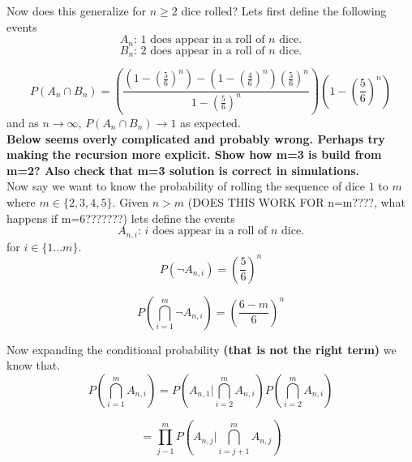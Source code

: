 \documentclass[12pt,a4paper]{article}
\begin{document}
Now does this generalize for $n\geq 2$ dice rolled? Lets first define the following events
\begin{equation}
A_n \text{: 1 does appear in a roll of $n$ dice.}
\end{equation}
\begin{equation}
B_n \text{: 2 does appear in a roll of $n$ dice.}
\end{equation}

\begin{equation}
P(A_n \cap B_n) = \left(\frac{\left(1-\left(\frac{5}{6}\right)^n\right) - \left(1-\left(\frac{4}{6}\right)^n\right)\left(\frac{5}{6}\right)^n}{1-\left(\frac{5}{6}\right)^n}\right) \left(1 - \left(\frac{5}{6}\right)^n\right)
\end{equation}
and as $n\to\infty$, $P(A_n \cap B_n) \to 1$ as expected.\\

\textbf{Below seems overly complicated and probably wrong. Perhaps try making the recursion more explicit. Show how m=3 is build from m=2? Also check that m=3 solution is correct in simulations.}\\

Now say we want to know the probability of rolling the sequence of dice $1$ to $m$ where $m\in\{2,3,4,5\}$. Given $n>m$ (DOES THIS  WORK FOR n=m????, what happens if m=6???????) lets define the events
\begin{equation}
A_{n,i} \text{: $i$ does appear in a roll of $n$ dice.}
\end{equation}
for $i \in \{1\ldots m\}$.\\

\begin{equation}
P(\neg A_{n,i}) = \left( \frac{5}{6} \right)^n
\label{eq:tmp2}
\end{equation}

\begin{equation}
P\left(\bigcap_{i=1}^m \neg A_{n,i}\right) = \left( \frac{6-m}{6} \right)^n
\label{eq:tmp_1}
\end{equation}

Now expanding the conditional probability \textbf{(that is not the right term)} we know that.
\begin{equation}
P\left(\bigcap_{i=1}^m A_{n,i}\right) = P\left(A_{n,1}|\bigcap_{i=2}^m A_{n,i}\right)P\left(\bigcap_{i=2}^m A_{n,i}\right)
\label{eq:tmp_3}
\end{equation}

\begin{equation}
= \prod_{j-1}^m P\left(A_{n,j}|\bigcap_{i=j+1}^m A_{n,j}\right)
\end{equation}
\end{document}
